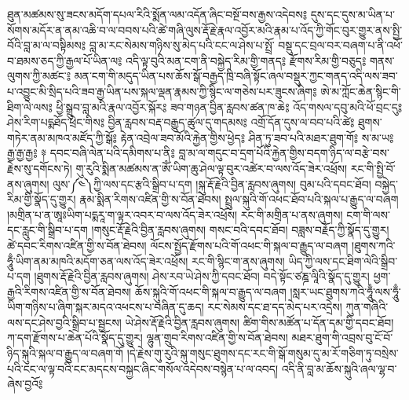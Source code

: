 ཐུན་མཚམས་སུ་ཟངས་མདོག་དཔལ་རིའི་སྨོན་ལམ་འདོན་ཞིང་བསྔོ་བས་རྒྱས་འདེབས༔
དུས་དང་དུས་མ་ཡིན་པ་སོགས་མདོར་ན་ནམ་འཆི་བ་ལ་བབས་པའི་ཚེ་གཞི་ལུས་རྡོ་རྗེ་རྣལ་འབྱོར་མའི་རྣམ་པ་འོད་ཀྱི་གོང་བུར་གྱུར་ནས་སྤྱི་བོའི་བླ་མ་ལ་བསྟིམས༔
བླ་མ་རང་སེམས་གཉིས་སུ་མེད་པའི་ངང་ལ་ཤེས་པ་སྤྲོ་
  བསྡུ་དང་བྲལ་བར་བཞག་པ་ནི་འཕོ་བ་ཐམས་ཅད་ཀྱི་རྒྱལ་པོ་ཡིན་ལ༔
འདི་ལྟ་བུའི་མན་ངག་ནི་བསྐྱེད་རིམ་གྱི་གནད༔ རྫོགས་རིམ་གྱི་བཅུད༔ གནས་ལུགས་ཀྱི་མཚང་༔
མན་ངག་གི་མདུད་ཡིན་པས་ཆོས་སྒོ་བརྒྱད་ཁྲི་བཞི་སྟོང་ཞལ་བསྡུར་ཀྱང་གནད་འདི་ལས་ཟབ་པ་འབྱུང་མི་སྲིད་པའི་ཟབ་རྒྱ་ཡིན་པས་སྐལ་ལྡན་རྣམས་ཀྱི་སྙིང་ལ་གཅེས་པར་ཟུངས་ཞིག༔
ཨེ་མ་ཀློང་ཆེན་སྙིང་གི་ཐིག་ལེ་ལས༔
ཕྱི་སྒྲུབ་བླ་མའི་རྣལ་འབྱོར་སྐོར༔
ཟབ་གཉན་བྱིན་རླབས་ཚན་ཁ་ཆེ༔
འོད་གསལ་དབུ་མའི་ཕོ་བྲང་དུ༔
ཤེས་རིག་པདྨཐོད་ཕྲེང་གིས༔
བྱིན་རླབས་བརྡ་བརྒྱུད་ཚུལ་དུ་གདམས༔
འགྲོ་དོན་དུས་ལ་བབ་པའི་ཚེ༔
ཐུགས་གཏེར་ནམ་མཁའ་མཛོད་ཀྱི་སྒོ༔
རྟེན་འབྲེལ་ཟབ་མོའི་རྐྱེན་གྱིས་ཕྱེད༔
ཤིན་ཏུ་ཟབ་པའི་མཐར་ཐུག་གོ༔
ས་མ་ཡ༔
རྒྱ་རྒྱ་རྒྱ༔
༈ དབང་བཞི་ལེན་པའི་དམིགས་པ་ནི༔
བླ་མ་ལ་གདུང་བ་དྲག་པོའི་རྐྱེན་གྱིས་བདག་ཉིད་ལ་བརྩེ་བས་རྗེས་སུ་དགོངས་ཏེ།
གུ་རུའི་སྨིན་མཚམས་ན་ཨོཾ་ཡིག་ཆུ་ཤེལ་ལྟ་བུར་འཚེར་བ་ལས་འོད་ཟེར་འཕྲོས།
རང་གི་སྤྱི་བོ་ནས་ཞུགས།
ལུས་༼༤༽ཀྱི་ལས་དང་རྩའི་སྒྲིབ་པ་དག
།སྐུ་རྡོ་རྗེའི་བྱིན་རླབས་ཞུགས།
བུམ་པའི་དབང་ཐོབ།
བསྐྱེད་རིམ་གྱི་སྣོད་དུ་གྱུར།
རྣམ་སྨིན་རིགས་འཛིན་གྱི་ས་བོན་ཐེབས།
སྤྲུལ་སྐུའི་གོ་འཕང་ཐོབ་པའི་སྐལ་པ་རྒྱུད་ལ་བཞག
།མགྲིན་པ་ན་ཨཱཿཡིག་པདྨརཱ་ག་ལྟར་འབར་བ་ལས་འོད་ཟེར་འཕྲོས།
རང་གི་མགྲིན་པ་ནས་ཞུགས།
ངག་གི་ལས་དང་རླུང་གི་སྒྲིབ་པ་དག
།གསུང་རྡོ་རྗེའི་བྱིན་རླབས་ཞུགས།
གསང་བའི་དབང་ཐོབ།
བཟླས་བརྗོད་ཀྱི་སྣོད་དུ་གྱུར།
ཚེ་དབང་རིགས་འཛིན་གྱི་ས་བོན་ཐེབས།
ལོངས་སྤྱོད་རྫོགས་པའི་གོ་འཕང་གི་སྐལ་བ་རྒྱུད་ལ་བཞག
།ཐུགས་ཀའི་ཧཱུྃ་ཡིག་ནམ་མཁའི་མདོག་ཅན་ལས་འོད་ཟེར་འཕྲོས།
རང་གི་སྙིང་ག་ནས་ཞུགས། ཡིད་ཀྱི་ལས་དང་ཐིག་ལེའི་སྒྲིབ་པ་དག
།ཐུགས་རྡོ་རྗེའི་བྱིན་རླབས་ཞུགས།
ཤེས་རབ་ཡེ་ཤེས་ཀྱི་དབང་ཐོབ།
བདེ་སྟོང་ཙཎྜ་ལཱིའི་སྣོད་དུ་གྱུར།
ཕྱག་རྒྱའི་རིགས་འཛིན་གྱི་ས་བོན་ཐེབས།
ཆོས་སྐུའི་གོ་འཕང་གི་སྐལ་བ་རྒྱུད་ལ་བཞག
།སླར་ཡང་ཐུགས་ཀའི་ཧཱུྃ་ལས་ཧཱུྃ་ཡིག་གཉིས་པ་ཞིག་སྐར་མདའ་འཕངས་པ་བཞིན་དུ་ཆད།
རང་སེམས་དང་ཐ་དད་མེད་པར་འདྲེས།
ཀུན་གཞིའི་ལས་དང་ཤེས་བྱའི་སྒྲིབ་པ་སྦྱངས།
ཡེ་ཤེས་རྡོ་རྗེའི་བྱིན་རླབས་ཞུགས།
ཚིག་གིས་མཚོན་པ་དོན་དམ་གྱི་དབང་ཐོབ།
ཀ་དག་རྫོགས་པ་ཆེན་པོའི་སྣོད་དུ་གྱུར།
ལྷུན་གྲུབ་རིགས་འཛིན་གྱི་ས་བོན་ཐེབས།
མཐར་ཐུག་གི་འབྲས་བུ་ངོ་བོ་ཉིད་སྐུའི་སྐལ་བ་རྒྱུད་ལ་བཞག་གོ
།དེ་རྗེས་གུ་རུའི་སྐུ་གསུང་ཐུགས་དང་རང་གི་སྒོ་གསུམ་དུ་མ་རོ་གཅིག་ཏུ་བསྲེས་པའི་ངང་ལ་ལྟ་བའི་ངང་མདངས་བསྐྱང་ཞིང་གསོལ་འདེབས་བསྙེན་པ་ལ་འབད།
འདི་ནི་བླ་མ་ཆོས་སྐུའི་ཞལ་ལྷ་བ་ཞེས་བྱའོ༔





